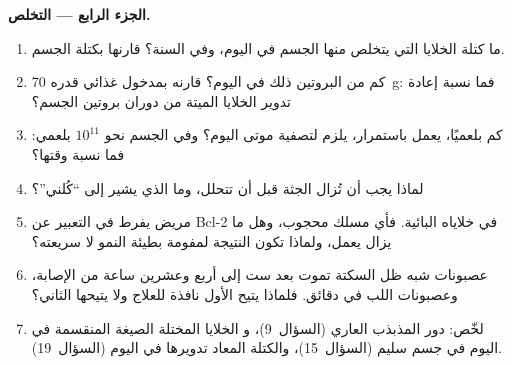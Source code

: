\begin{problem}
\medskip
\noindent\textbf{الجزء الرابع --- التخلص.}
\begin{enumerate}[resume]
  \item ما كتلة الخلايا التي يتخلص منها الجسم  في
        اليوم، وفي السنة؟ قارنها بكتلة الجسم.
  \item كم من البروتين ذلك في اليوم؟ قارنه بمدخول
        غذائي قدره \qty{70}{g}: فما نسبة إعادة تدوير الخلايا الميتة
        من دوران بروتين الجسم؟
  \item كم بلعميًا، يعمل باستمرار، يلزم
        لتصفية موتى اليوم؟ وفي الجسم نحو $10^{11}$
        بلعمي: فما نسبة وقتها؟
  \item لماذا يجب أن تُزال الجثة قبل أن تتحلل، وما الذي
        يشير إلى ``كُلني''؟
  \item مريض يفرط في التعبير عن Bcl-2 في خلاياه البائية. فأي مسلك
        محجوب، وهل ما يزال  يعمل، ولماذا تكون
        النتيجة لمفومة بطيئة النمو لا سريعته؟
  \item عصبونات شبه ظل السكتة تموت  بعد ست إلى
        أربع وعشرين ساعة من الإصابة، وعصبونات اللب 
        في دقائق. فلماذا يتيح الأول نافذة
        للعلاج ولا يتيحها الثاني؟
  \item لخّص: دور المذبذب العاري (السؤال~9)، و
        الخلايا المختلة الصيغة المنقسمة في اليوم في جسم سليم
        (السؤال~15)، والكتلة المعاد تدويرها  في اليوم
        (السؤال~19).
\end{enumerate}
\end{problem}
